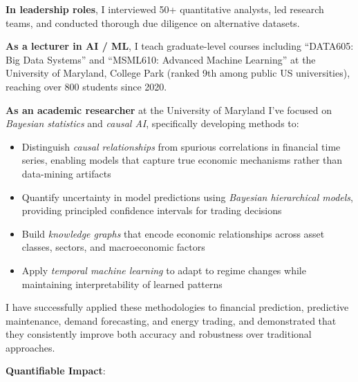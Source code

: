\documentclass[11pt, letterpaper]{article}
\begin{document}
  \textbf{In leadership roles}, I interviewed 50+ quantitative analysts, led
  research teams, and conducted thorough due diligence on alternative datasets.

  \textbf{As a lecturer in AI / ML}, I teach graduate-level courses including
  ``DATA605: Big Data Systems'' and ``MSML610: Advanced Machine Learning'' at
  the University of Maryland, College Park (ranked 9th among public US
  universities), reaching over 800 students since 2020.

  \textbf{As an academic researcher} at the University of Maryland I've focused
  on \textit{Bayesian statistics} and \textit{causal AI}, specifically
  developing methods to:

  \begin{itemize}
    \item Distinguish \textit{causal relationships} from spurious correlations
      in financial time series, enabling models that capture true economic
      mechanisms rather than data-mining artifacts

    \item Quantify uncertainty in model predictions using \textit{Bayesian
      hierarchical models}, providing principled confidence intervals for
      trading decisions

    \item Build \textit{knowledge graphs} that encode economic relationships
      across asset classes, sectors, and macroeconomic factors

    \item Apply \textit{temporal machine learning} to adapt to regime changes
      while maintaining interpretability of learned patterns
  \end{itemize}

  I have successfully applied these methodologies to financial prediction,
  predictive maintenance, demand forecasting, and energy trading, and
  demonstrated that they consistently improve both accuracy and robustness
  over traditional approaches.

  \textbf{Quantifiable Impact}:
\end{document}
